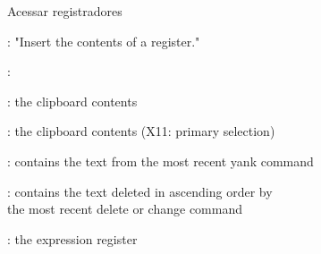 \begin{frame}{Acessar registradores}
    \begin{widedescription}
        \item {}: "Insert the contents of a register."
        \item {}:
        \begin{description}
            \item \key{+}:	the clipboard contents
            \item \key{*}:	the clipboard contents (X11: primary selection)
            \item {}: contains the text from the most recent yank command
            \item {}: contains the text deleted in ascending order by \\ the most recent delete or change command
            \item \key{=}: the expression register
        \end{description}
    \end{widedescription}
\end{frame}


